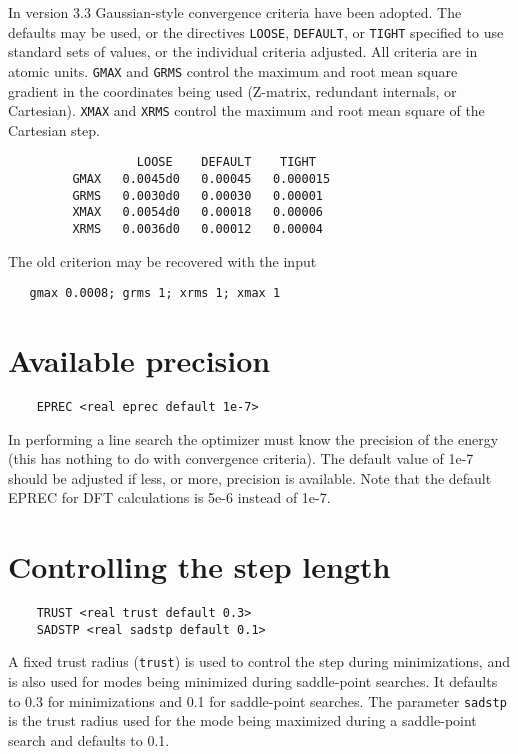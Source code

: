  In version 3.3 Gaussian-style convergence criteria have been adopted.
The defaults may be used, or the directives \verb+LOOSE+,
\verb+DEFAULT+, or \verb+TIGHT+ specified to use standard sets of
values, or the individual criteria adjusted.  All criteria are in
atomic units.
\verb+GMAX+ and \verb+GRMS+ control the maximum and root mean square
gradient in the coordinates being used (Z-matrix, redundant internals,
or Cartesian).  \verb+XMAX+ and \verb+XRMS+ control the maximum and
root mean square of the Cartesian step.

\begin{verbatim}
                  LOOSE    DEFAULT    TIGHT
         GMAX   0.0045d0   0.00045   0.000015   
         GRMS   0.0030d0   0.00030   0.00001
         XMAX   0.0054d0   0.00018   0.00006
         XRMS   0.0036d0   0.00012   0.00004
\end{verbatim}

The old criterion may be recovered with the input
\begin{verbatim}
   gmax 0.0008; grms 1; xrms 1; xmax 1
\end{verbatim}

\section{Available precision}

\begin{verbatim}
    EPREC <real eprec default 1e-7>
\end{verbatim}

In performing a line search the optimizer must know the
precision of the energy (this has nothing to
do with convergence criteria).  The default value
of 1e-7 should be adjusted if less, or more, precision
is available.  Note that the default EPREC for DFT
calculations is 5e-6 instead of 1e-7.

\section{Controlling the step length}

\begin{verbatim}
    TRUST <real trust default 0.3>
    SADSTP <real sadstp default 0.1>
\end{verbatim}

A fixed trust radius (\verb+trust+) is used to control the step during
minimizations, and is also used for modes being minimized during
saddle-point searches.  It defaults to 0.3 for minimizations and 0.1
for saddle-point searches.  The parameter \verb+sadstp+ is the trust
radius used for the mode being maximized during a saddle-point search
and defaults to 0.1.

